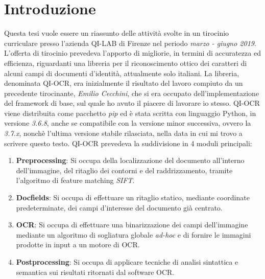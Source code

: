 \chapter*{Introduzione}

Questa tesi vuole essere un riassunto delle attivit\`a svolte in un tirocinio curriculare presso l'azienda QI-LAB di Firenze nel periodo \textit{marzo - giugno 2019}. L'offerta di tirocinio prevedeva l'apporto di migliorie, in termini di accuratezza ed efficienza, riguardanti una libreria per il riconoscimento ottico dei caratteri di alcuni campi di documenti d'identit\`a, attualmente solo italiani. La libreria, denominata QI-OCR, era inizialmente il risultato del lavoro compiuto da un precedente tirocinante, \textit{Emilio Cecchini}, che si era occupato dell'implementazione del framework di base, sul quale ho avuto il piacere di lavorare io stesso. QI-OCR viene distribuita come pacchetto \textit{pip} ed \`e stata scritta con linguaggio Python, in versione \textit{3.6.8}, anche se compatibile con la versione minor successiva, ovvero la \textit{3.7.x}, nonch\`e l'ultima versione stabile rilasciata, nella data in cui mi trovo a scrivere questo testo. QI-OCR prevedeva la suddivisione in 4 moduli principali:
\begin{enumerate}
	\item \textbf{Preprocessing}: Si occupa della localizzazione del documento all'interno dell'immagine, del ritaglio dei contorni e del raddrizzamento, tramite l'algoritmo di feature matching \textit{SIFT}.
	\item \textbf{Docfields}: Si occupa di effettuare un ritaglio statico, mediante coordinate predeterminate, dei campi d'interesse del documento gi\`a centrato.
	\item \textbf{OCR}: Si occupa di effettuare una binarizzazione dei campi dell'immagine mediante un algoritmo di sogliatura globale \textit{ad-hoc} e di fornire le immagini prodotte in input a un motore di OCR.
	\item \textbf{Postprocessing}: Si occupa di applicare tecniche di analisi sintattica e semantica sui risultati ritornati dal software OCR.
\end{enumerate}
